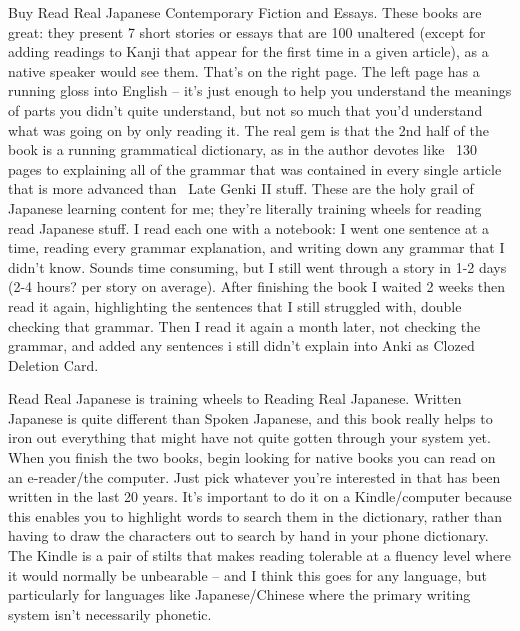 Buy Read Real Japanese Contemporary Fiction and Essays.
These books are great: they present 7 short stories or essays that are 100 unaltered (except for adding readings to Kanji that appear for the first time in a given article), as a native speaker would see them. That's on the right page. The left page has a running gloss into English -- it's just enough to help you understand the meanings of parts you didn't quite understand, but not so much that you'd understand what was going on by only reading it. The real gem is that the 2nd half of the book is a running grammatical dictionary, as in the author devotes like ~130 pages to explaining all of the grammar that was contained in every single article that is more advanced than ~Late Genki II stuff. These are the holy grail of Japanese learning content for me; they're literally training wheels for reading read Japanese stuff. I read each one with a notebook: I went one sentence at a time, reading every grammar explanation, and writing down any grammar that I didn't know. Sounds time consuming, but I still went through a story in 1-2 days (2-4 hours? per story on average). After finishing the book I waited 2 weeks then read it again, highlighting the sentences that I still struggled with, double checking that grammar. Then I read it again a month later, not checking the grammar, and added any sentences i still didn't explain into Anki as Clozed Deletion Card.

Read Real Japanese is training wheels to Reading Real Japanese.
Written Japanese is quite different than Spoken Japanese, and this book really helps to iron out everything that might have not quite gotten through your system yet. When you finish the two books, begin looking for native books you can read on an e-reader/the computer. Just pick whatever you're interested in that has been written in the last 20 years. It's important to do it on a Kindle/computer because this enables you to highlight words to search them in the dictionary, rather than having to draw the characters out to search by hand in your phone dictionary. The Kindle is a pair of stilts that makes reading tolerable at a fluency level where it would normally be unbearable -- and I think this goes for any language, but particularly for languages like Japanese/Chinese where the primary writing system isn't necessarily phonetic.

